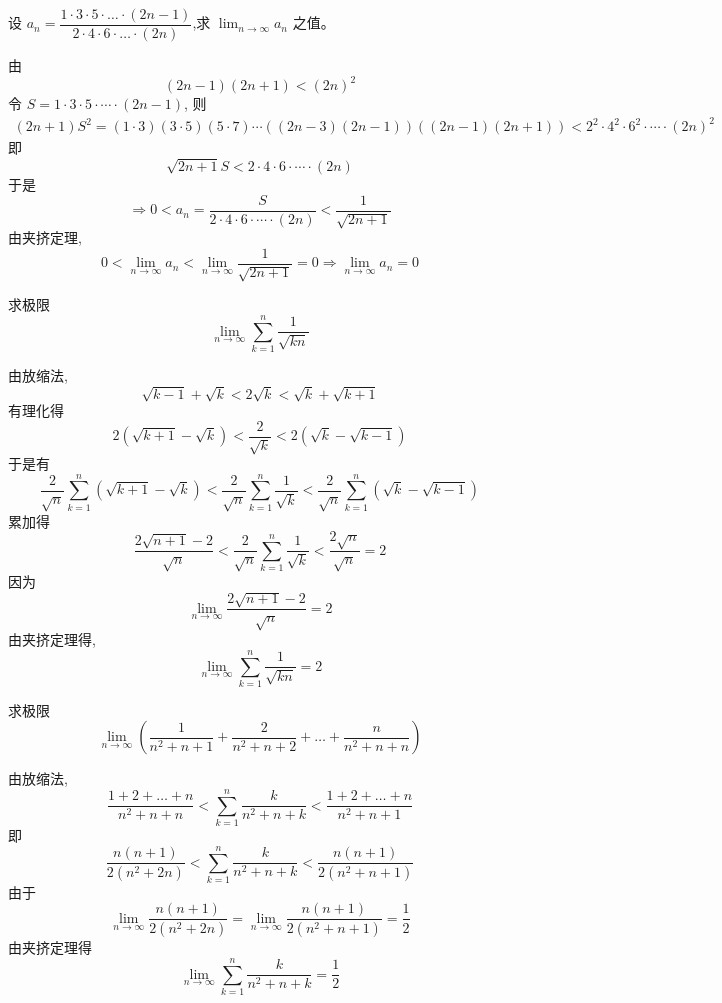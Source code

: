 \begin{questions}
    \question 设 $a_n = \dfrac{1 \cdot 3 \cdot 5 \cdot \dots \cdot (2n-1)}{2 \cdot 4 \cdot 6 \cdot \dots \cdot (2n)}$,求 $\displaystyle \lim_{n \to \infty} a_n$ 之值。
    \begin{solution}
        由
        \[
        (2n-1)(2n+1) < (2n)^2
        \]
        令 $S=1\cdot 3\cdot 5\cdot \cdots \cdot (2n-1)$, 则
        \begin{align*} 
        (2n+1)S^2 = (1\cdot 3)(3\cdot 5)(5\cdot 7)\cdots ((2n-3)(2n-1))((2n-1)(2n+1))
        < 2^2\cdot 4^2 \cdot 6^2\cdot \cdots \cdot (2n)^2
        \end{align*}
        即
        \[
        \sqrt{2n+1}S < 2\cdot 4\cdot 6\cdot \cdots \cdot (2n)
        \]
        于是
        \[
        \Rightarrow 0 < a_n=\frac{S}{2\cdot 4\cdot 6\cdot \cdots \cdot (2n)} < \frac{1}{\sqrt{2n+1}}
        \]
        由夹挤定理,
        \[
        0 < \lim_{n\to \infty} a_n < \lim_{n\to \infty} \frac{1}{\sqrt{2n+1}}=0 \Rightarrow \lim_{n\to \infty} a_n = 0
        \]
    \end{solution}

    \question 求极限
    \[
    \lim_{n \to \infty} \sum_{k=1}^{n} \frac{1}{\sqrt{kn}}
    \]
    \begin{solution}
        由放缩法,
        \[
        \sqrt{k-1}+ \sqrt{k} < 2\sqrt{k} < \sqrt{k} + \sqrt{k+1} 
        \]
        有理化得
        \[
        2(\sqrt{k+1}-\sqrt{k}) < \frac{2}{\sqrt{k}} < 2(\sqrt{k}-\sqrt{k-1})
        \]
        于是有
        \[
        \frac{2}{\sqrt{n}} \sum_{k=1}^{n} (\sqrt{k+1}-\sqrt{k}) < \frac{2}{\sqrt{n}} \sum_{k=1}^{n} \frac{1}{\sqrt{k}} < \frac{2}{\sqrt{n}} \sum_{k=1}^{n} (\sqrt{k}-\sqrt{k-1})
        \]
        累加得
        \[
        \frac{2\sqrt{n+1}-2}{\sqrt{n}} < \frac{2}{\sqrt{n}} \sum_{k=1}^{n} \frac{1}{\sqrt{k}} < \frac{2\sqrt{n}}{\sqrt{n}} = 2
        \]
        因为
        \[
        \lim_{n \to \infty} \frac{2\sqrt{n+1}-2}{\sqrt{n}} = 2
        \]
        由夹挤定理得,
        \[
        \lim_{n \to \infty} \sum_{k=1}^{n} \frac{1}{\sqrt{kn}} = 2
        \]
    \end{solution}

    \question 求极限
    \[\lim_{n \to \infty} \left(\frac{1}{n^2+n+1} + \frac{2}{n^2+n+2} + \dots + \frac{n}{n^2+n+n}\right)\]
    \begin{solution}
        由放缩法,
        \[
        \frac{1 + 2 + \dots + n}{n^2+n+n} < \sum_{k=1}^{n} \frac{k}{n^2+n+k} < \frac{1 + 2 + \dots + n}{n^2+n+1}
        \]
        即
        \[
        \frac{n(n+1)}{2(n^2+2n)} < \sum_{k=1}^{n} \frac{k}{n^2+n+k} < \frac{n(n+1)}{2(n^2+n+1)}
        \]
        由于
        \[
        \lim_{n \to \infty} \frac{n(n+1)}{2(n^2+2n)} =
        \lim_{n \to \infty} \frac{n(n+1)}{2(n^2+n+1)} = \frac{1}{2}
        \]
        由夹挤定理得
        \[
        \lim_{n \to \infty} \sum_{k=1}^{n} \frac{k}{n^2+n+k} = \frac{1}{2}
        \]
    \end{solution}


\end{questions}
